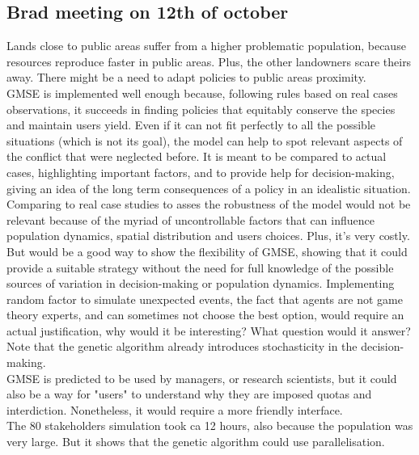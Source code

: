 \documentclass[12pt]{article}
\begin{document}
\subsection*{Brad meeting on 12th of october}
Lands close to public areas suffer from a higher problematic population, because resources reproduce faster in public areas. Plus, the other landowners scare theirs away. There might be a need to adapt policies to public areas proximity.\\
GMSE is implemented well enough because, following rules based on real cases observations, it succeeds in finding policies that equitably conserve the species and maintain users yield.
Even if it can not fit perfectly to all the possible situations (which is not its goal), the model can help to spot relevant aspects of the conflict that were neglected before.
It is meant to be compared to actual cases, highlighting important factors, and to provide help for decision-making, giving an idea of the long term consequences of a policy in an idealistic situation.\\
Comparing to real case studies to asses the robustness of the model would not be relevant because of the myriad of uncontrollable factors that can influence population dynamics, spatial distribution and users choices.
Plus, it's very costly.
But would be a good way to show the flexibility of GMSE, showing that it could provide a suitable strategy without the need for full knowledge of the possible sources of variation in decision-making or population dynamics.
Implementing random factor to simulate unexpected events, the fact that agents are not game theory experts, and can sometimes not choose the best option, would require an actual justification, why would it be interesting?
What question would it answer?
Note that the genetic algorithm already introduces stochasticity in the decision-making.\\
GMSE is predicted to be used by managers, or research scientists, but it could also be a way for "users" to understand why they are imposed quotas and interdiction.
Nonetheless, it would require a more friendly interface.\\
The 80 stakeholders simulation took ca 12 hours, also because the population was very large.
But it shows that the genetic algorithm could use parallelisation.\\
\end{document}
